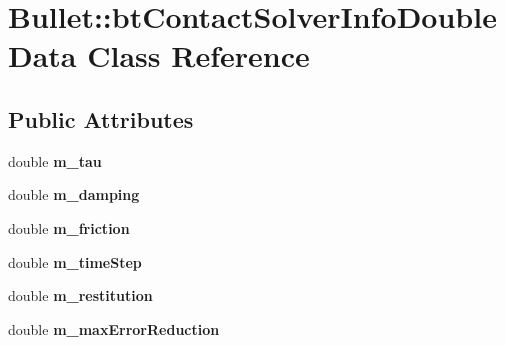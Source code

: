 \hypertarget{class_bullet_1_1bt_contact_solver_info_double_data}{\section{Bullet\+:\+:bt\+Contact\+Solver\+Info\+Double\+Data Class Reference}
\label{class_bullet_1_1bt_contact_solver_info_double_data}
}
\subsection*{Public Attributes}
\begin{DoxyCompactItemize}
\item 
\hypertarget{class_bullet_1_1bt_contact_solver_info_double_data_a2cf16279cb567dadc3162f0bb6711c36}{double {\bfseries m\+\_\+tau}}\label{class_bullet_1_1bt_contact_solver_info_double_data_a2cf16279cb567dadc3162f0bb6711c36}

\item 
\hypertarget{class_bullet_1_1bt_contact_solver_info_double_data_a0e7fd697de248e80d295d40a98d5ce58}{double {\bfseries m\+\_\+damping}}\label{class_bullet_1_1bt_contact_solver_info_double_data_a0e7fd697de248e80d295d40a98d5ce58}

\item 
\hypertarget{class_bullet_1_1bt_contact_solver_info_double_data_ab94025b903214074df06c23e306e5a66}{double {\bfseries m\+\_\+friction}}\label{class_bullet_1_1bt_contact_solver_info_double_data_ab94025b903214074df06c23e306e5a66}

\item 
\hypertarget{class_bullet_1_1bt_contact_solver_info_double_data_ad52b383d6ffbfa8a49e5c887797da552}{double {\bfseries m\+\_\+time\+Step}}\label{class_bullet_1_1bt_contact_solver_info_double_data_ad52b383d6ffbfa8a49e5c887797da552}

\item 
\hypertarget{class_bullet_1_1bt_contact_solver_info_double_data_a61180f51fbef308d82f4c0edc8ba0a65}{double {\bfseries m\+\_\+restitution}}\label{class_bullet_1_1bt_contact_solver_info_double_data_a61180f51fbef308d82f4c0edc8ba0a65}

\item 
\hypertarget{class_bullet_1_1bt_contact_solver_info_double_data_ac4c06db5c78a52535ed687897ce77a30}{double {\bfseries m\+\_\+max\+Error\+Reduction}}\label{class_bullet_1_1bt_contact_solver_info_double_data_ac4c06db5c78a52535ed687897ce77a30}


\end{DoxyCompactItemize}
